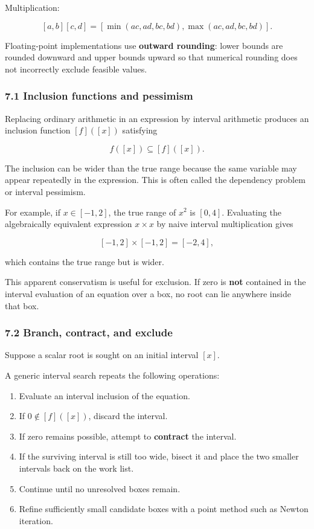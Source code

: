 \documentclass[11pt]{article}
\providecommand{\tightlist}{%
      \setlength{\itemsep}{0pt}\setlength{\parskip}{0pt}}
\begin{document}
Multiplication:

\[
[a,b][c,d]
=
[\min(ac,ad,bc,bd),\max(ac,ad,bc,bd)].
\]

Floating-point implementations use \textbf{outward rounding}: lower
bounds are rounded downward and upper bounds upward so that numerical
rounding does not incorrectly exclude feasible values.

    \hypertarget{inclusion-functions-and-pessimism}{%
\subsubsection{7.1 Inclusion functions and
pessimism}\label{inclusion-functions-and-pessimism}}

Replacing ordinary arithmetic in an expression by interval arithmetic
produces an inclusion function \([f]([x])\) satisfying

\[
f([x])\subseteq [f]([x]).
\]

The inclusion can be wider than the true range because the same variable
may appear repeatedly in the expression. This is often called the
dependency problem or interval pessimism.

For example, if \(x\in[-1,2]\), the true range of \(x^2\) is \([0,4]\).
Evaluating the algebraically equivalent expression \(x\times x\) by
naive interval multiplication gives

\[
[-1,2]\times[-1,2]=[-2,4],
\]

which contains the true range but is wider.

This apparent conservatism is useful for exclusion. If zero is
\textbf{not} contained in the interval evaluation of an equation over a
box, no root can lie anywhere inside that box.

    \hypertarget{branch-contract-and-exclude}{%
\subsubsection{7.2 Branch, contract, and
exclude}\label{branch-contract-and-exclude}}

Suppose a scalar root is sought on an initial interval \([x]\).

A generic interval search repeats the following operations:

\begin{enumerate}
\def\labelenumi{\arabic{enumi}.}
\tightlist
\item
  Evaluate an interval inclusion of the equation.
\item
  If \(0\notin[f]([x])\), discard the interval.
\item
  If zero remains possible, attempt to \textbf{contract} the interval.
\item
  If the surviving interval is still too wide, bisect it and place the
  two smaller intervals back on the work list.
\item
  Continue until no unresolved boxes remain.
\item
  Refine sufficiently small candidate boxes with a point method such as
  Newton iteration.
\end{enumerate}
\end{document}
